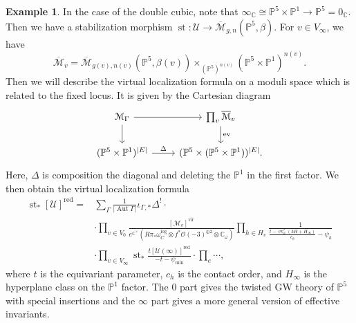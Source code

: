 \documentclass[10pt]{amsart}
\theoremstyle{definition}
\newtheorem{exm}[thm]{Example}
\theoremstyle{remark}
\theoremstyle{plain}
\theoremstyle{definition}
\theoremstyle{remark}
\newcommand{\C}{\mathbb{C}}
\renewcommand{\P}{\mathbb{P}}
\newcommand{\Mbar}{\overline{\mathcal{M}}}
\newcommand{\mc}[1]{\mathcal{#1}}
\newcommand{\mr}[1]{\mathrm{#1}}
\newcommand{\on}[1]{\operatorname{#1}}
\newcommand{\1}{\mathbf{1}}
\newcommand{\2}{\mathbf{2}}
\newcommand{\3}{\mathbf{3}}
\newcommand{\vir}{\mr{vir}}
\newcommand{\red}{\mr{red}}
\DeclareMathOperator{\Aut}{Aut}
\DeclareMathOperator{\ev}{ev}
\begin{document}
\begin{exm}
    In the case of the double cubic, note that $\infty_{\C} \cong \P^5 \times \P^1 \to \P^5 = 0_{\C}$. Then we have a stabilization morphism $\on{st} \colon\mc{U} \to \Mbar_{g,n}(\P^5,\beta)$. For $v \in V_{\infty}$, we have
    \[ \Mbar_v = \Mbar_{g(v), n(v)}(\P^5, \beta(v)) \times_{(\P^5)^{n(v)}} (\P^5 \times \P^1)^{n(v)}. \]
    Then we will describe the virtual localization formula on a moduli space which is related to the fixed locus. It is given by the Cartesian diagram
    \begin{equation*}
    \begin{tikzcd}
        \mc{M}_{\Gamma} \ar{r} \ar{d} & \prod_v \Mbar_v \ar{d}{\ev} \\
        (\P^5 \times \P^1)^{|E|} \ar{r}{\Delta} & (\P^5 \times ( \P^5 \times \P^1 ))^{|E|}.
    \end{tikzcd}
    \end{equation*}
    Here, $\Delta$ is composition the diagonal and deleting the $\P^1$ in the first factor. We then obtain the virtual localization formula
    \begin{align*}
        \on{st}_* [\mc{U}]^{\red} ={}& \sum_{\Gamma} \frac{1}{|\Aut \Gamma|} \iota_{\Gamma,*} \Delta^! \cdot \\
        &\cdot \prod_{v \in V_0} \frac{[\mc{M}_v]^{\vir}}{e^{\C^{\times}}(R\pi_* \omega_C^{\log} \otimes f^* \mc{O}(-3)^{\oplus 2} \otimes \C_{\omega})} \prod_{h \in H_v} \frac{1}{\frac{ t-\ev_h^*(3H+H_{\infty}) }{c_h} - \psi_h} \\
        &\cdot \prod_{v \in V_{\infty}} \on{st}_* \frac{t [\mc{U}(\infty)]^{\red}}{-t-\psi_{\min}} 
        \cdot \prod_{e} \cdots,
    \end{align*}
    where $t$ is the equivariant parameter, $c_h$ is the contact order, and $H_{\infty}$ is the hyperplane class on the $\P^1$ factor. The $0$ part gives the twisted GW theory of $\P^5$ with special insertions and the $\infty$ part gives a more general version of effective invariants.
\end{exm}
\end{document}
